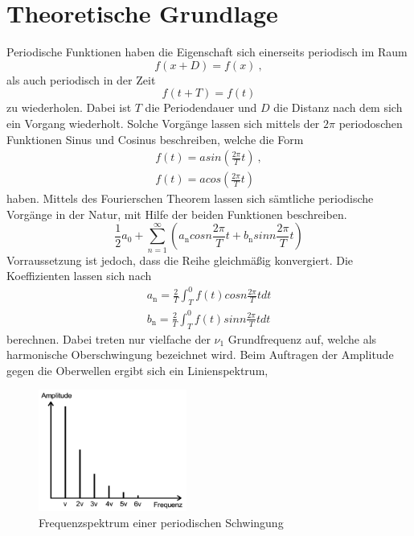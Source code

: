 \section{Theoretische Grundlage}
\label{sec:Theorie}
Periodische Funktionen haben die Eigenschaft sich einerseits periodisch im Raum
\begin{equation}
  f(x + D) = f(x) \ ,
  \label{eqn:f(x)}
\end{equation}
als auch periodisch in der Zeit
\begin{equation}
  f(t + T) =f(t)
  \label{eqn:f(t)}
\end{equation}
zu wiederholen. Dabei ist $T$ die Periodendauer und $D$ die Distanz nach dem sich ein Vorgang wiederholt. Solche Vorgänge lassen sich mittels der $2 \pi$ periodoschen Funktionen Sinus und Cosinus beschreiben, welche die Form
\begin{eqnarray}
  f(t) = a sin \left( \frac{2 \pi}{T} t \right) \ ,	\\
  f(t) = a cos \left( \frac{2 \pi}{T} t \right)
  \label{eqn:sin}
\end{eqnarray}
haben. Mittels des Fourierschen Theorem lassen sich sämtliche periodische Vorgänge in der Natur, mit Hilfe der beiden Funktionen beschreiben.
\begin{equation}
  \frac{1}{2} a_0 + \sum^{\infty}_{n=1} \left( a_\text{n} cos n \frac{2 \pi}{T} t + b_\text{n} sin n \frac{2 \pi}{T} t \right)
  \label{eqn:fourier}
\end{equation}
Vorraussetzung ist jedoch, dass die Reihe gleichmäßig konvergiert. Die Koeffizienten lassen sich nach
\begin{eqnarray}
  a_\text{n} = \frac{2}{T} \int^0_T f(t) cos n \frac{2 \pi}{T} t dt	\\
  b_\text{n} = \frac{2}{T} \int^0_T f(t) sin n \frac{2 \pi}{T} t dt
  \label{eqn:Koef}
\end{eqnarray}
berechnen. Dabei treten nur vielfache der $\nu_1$ Grundfrequenz auf, welche als harmonische Oberschwingung bezeichnet wird. Beim Auftragen der Amplitude gegen die Oberwellen ergibt sich ein Linienspektrum,
\begin{figure}
  \centering
  \includegraphics[height=4cm]{picture/Frequenzspektrum.png}
  \caption{Frequenzspektrum einer periodischen Schwingung}
  \label{fig:fre}
\end{figure}                    %
